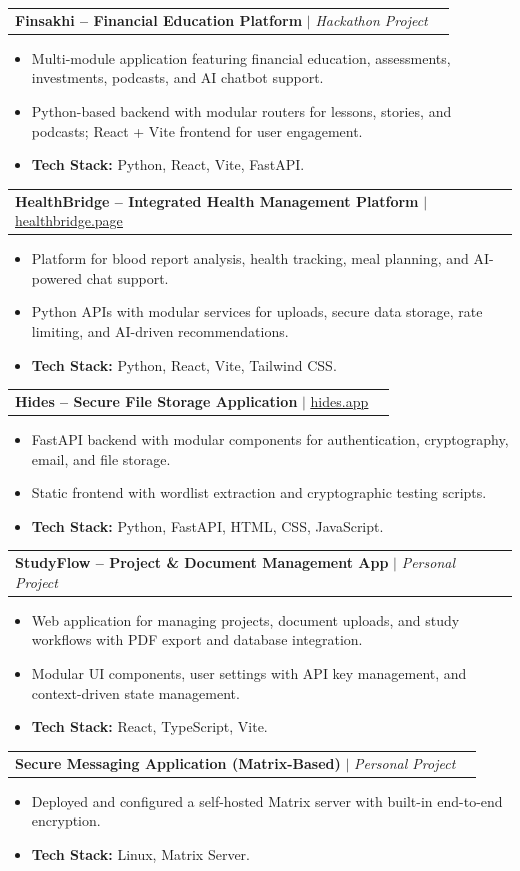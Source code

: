 \documentclass[letterpaper,11pt]{article}
\makeatletter
\newcommand{\resumeItem}[1]{
  \item\small{
    {#1 \vspace{-2pt}}
  }
}
\newcommand{\resumeProjectHeading}[2]{
    \item
    \begin{tabular*}{0.97\textwidth}{l@{\extracolsep{\fill}}r}
      \small#1 & #2 \\
    \end{tabular*}\vspace{-7pt}
}
\newcommand{\resumeItemListStart}{\begin{itemize}}
\newcommand{\resumeItemListEnd}{\end{itemize}\vspace{-5pt}}
\makeatother
\begin{document}
      \resumeProjectHeading
          {\textbf{Finsakhi -- Financial Education Platform} $|$ \emph{Hackathon Project}}{}
          \resumeItemListStart
            \resumeItem{Multi-module application featuring financial education, assessments, investments, podcasts, and AI chatbot support.}
            \resumeItem{Python-based backend with modular routers for lessons, stories, and podcasts; React + Vite frontend for user engagement.}
            \resumeItem{\textbf{Tech Stack:} Python, React, Vite, FastAPI.}
          \resumeItemListEnd

      \resumeProjectHeading
          {\textbf{HealthBridge -- Integrated Health Management Platform} $|$ \href{https://healthbridge.page}{\underline{healthbridge.page}}}{}
          \resumeItemListStart
            \resumeItem{Platform for blood report analysis, health tracking, meal planning, and AI-powered chat support.}
            \resumeItem{Python APIs with modular services for uploads, secure data storage, rate limiting, and AI-driven recommendations.}
            \resumeItem{\textbf{Tech Stack:} Python, React, Vite, Tailwind CSS.}
          \resumeItemListEnd

      \resumeProjectHeading
          {\textbf{Hides -- Secure File Storage Application} $|$ \href{https://hides.app}{\underline{hides.app}}}{}
          \resumeItemListStart
            \resumeItem{FastAPI backend with modular components for authentication, cryptography, email, and file storage.}
            \resumeItem{Static frontend with wordlist extraction and cryptographic testing scripts.}
            \resumeItem{\textbf{Tech Stack:} Python, FastAPI, HTML, CSS, JavaScript.}
          \resumeItemListEnd

      \resumeProjectHeading
          {\textbf{StudyFlow -- Project \& Document Management App} $|$ \emph{Personal Project}}{}
          \resumeItemListStart
            \resumeItem{Web application for managing projects, document uploads, and study workflows with PDF export and database integration.}
            \resumeItem{Modular UI components, user settings with API key management, and context-driven state management.}
            \resumeItem{\textbf{Tech Stack:} React, TypeScript, Vite.}
          \resumeItemListEnd

      \resumeProjectHeading
          {\textbf{Secure Messaging Application (Matrix-Based)} $|$ \emph{Personal Project}}{}
          \resumeItemListStart
            \resumeItem{Deployed and configured a self-hosted Matrix server with built-in end-to-end encryption.}
            \resumeItem{\textbf{Tech Stack:} Linux, Matrix Server.}
          \resumeItemListEnd
\end{document}
